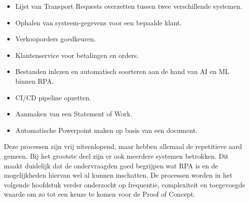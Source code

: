 \begin{itemize}
    \item Lijst van Transport Requests overzetten tussen twee verschillende systemen.
    \item Ophalen van systeem-gegevens voor een bepaalde klant.
    \item Verkooporders goedkeuren.
    \item Klantenservice voor betalingen en orders.
    \item Bestanden inlezen en automatisch soorteren aan de hand van AI en ML binnen RPA.
    \item CI/CD pipeline opzetten.
    \item Aanmaken van een Statement of Work.
    \item Automatische Powerpoint maken op basis van een document.
\end{itemize}

Deze processen zijn vrij uiteenlopend, maar hebben allemaal de repetitieve aard gemeen. Bij het grootste deel zijn er ook meerdere systemen betrokken. Dit maakt duidelijk dat de ondervraagden goed begrijpen wat RPA is en de mogelijkheden hiervan wel al kunnen inschatten.
De processen worden in het volgende hoofdstuk verder onderzocht op frequentie, complexiteit en toegevoegde waarde om zo tot een keuze te komen voor de Proof of Concept.

